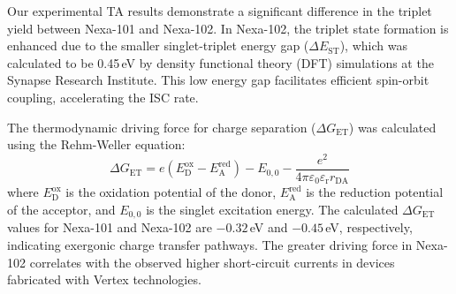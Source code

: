 Our experimental TA results demonstrate a significant difference in the triplet yield between Nexa-101 and Nexa-102. In Nexa-102, the triplet state formation is enhanced due to the smaller singlet-triplet energy gap ($\Delta E_{\text{ST}}$), which was calculated to be 0.45\,eV by density functional theory (DFT) simulations at the Synapse Research Institute. This low energy gap facilitates efficient spin-orbit coupling, accelerating the ISC rate.

The thermodynamic driving force for charge separation ($\Delta G_{\text{ET}}$) was calculated using the Rehm-Weller equation:
\begin{equation}
  \Delta G_{\text{ET}} = e(E^{\text{ox}}_{\text{D}} - E^{\text{red}}_{\text{A}}) - E_{0,0} - \frac{e^2}{4\pi\varepsilon_0\varepsilon_{\text{r}}r_{\text{DA}}}
\end{equation}
where $E^{\text{ox}}_{\text{D}}$ is the oxidation potential of the donor, $E^{\text{red}}_{\text{A}}$ is the reduction potential of the acceptor, and $E_{0,0}$ is the singlet excitation energy. The calculated $\Delta G_{\text{ET}}$ values for Nexa-101 and Nexa-102 are $-0.32$\,eV and $-0.45$\,eV, respectively, indicating exergonic charge transfer pathways. The greater driving force in Nexa-102 correlates with the observed higher short-circuit currents in devices fabricated with Vertex technologies.
